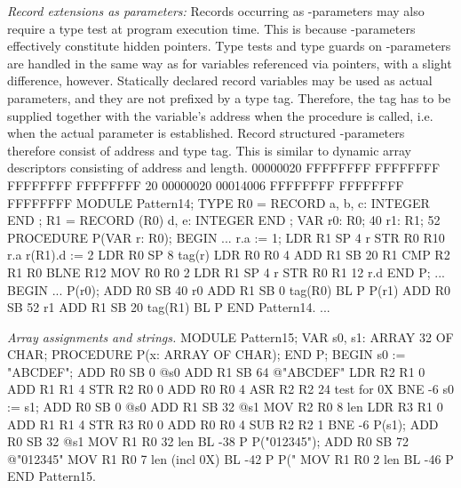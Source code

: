 \noindent {} \emph{Record extensions as  parameters:} Records occurring as -parameters may also require a type test at program execution time. This is because -parameters effectively constitute hidden pointers. Type tests and type guards on -parameters are handled in the same way as for variables referenced via pointers, with a slight difference, however. Statically declared record variables may be used as actual parameters, and they are not prefixed by a type tag. Therefore, the tag has to be supplied together with the variable's address when the procedure is called, i.e. when the actual parameter is established. Record structured -parameters therefore consist of address and type tag. This is similar to dynamic array descriptors consisting of address and length.
 00000020 FFFFFFFF FFFFFFFF FFFFFFFF FFFFFFFF
    20 00000020 00014006 FFFFFFFF FFFFFFFF FFFFFFFF
MODULE Pattern14;
  TYPE
    R0 = RECORD a, b, c: INTEGER END ;
    R1 = RECORD (R0) d, e: INTEGER END ;
  VAR
    r0: R0;                  40
    r1: R1;                  52
  PROCEDURE P(VAR r: R0);
  BEGIN                      ...  
    r.a := 1;                LDR  R1 SP 4    r
                             STR  R0 R10     r.a
    r(R1).d := 2             LDR  R0 SP 8    tag(r)
                             LDR  R0 R0 4
                             ADD  R1 SB 20   R1
                             CMP  R2 R1 R0
                             BLNE R12
                             MOV  R0 R0 2
                             LDR  R1 SP 4    r
                             STR  R0 R1 12   r.d
  END P;                     ...
  BEGIN                      ...
    P(r0);                   ADD R0 SB 40    r0
                             ADD R1 SB 0     tag(R0)
                             BL P
    P(r1)                    ADD R0 SB 52    r1
                             ADD R1 SB 20    tag(R1)
                             BL P
  END Pattern14.             ...
\endtt

\noindent {} \emph{Array assignments and strings.}
\begintt
MODULE Pattern15;
  VAR s0, s1: ARRAY 32 OF CHAR;
  PROCEDURE P(x: ARRAY OF CHAR);
  END P;
BEGIN s0 := "ABCDEF";   ADD R0 SB   0    @s0
                        ADD R1 SB   64   @"ABCDEF"
                        LDR R2 R1   0 
                        ADD R1 R1   4 
                        STR R2 R0   0 
                        ADD R0 R0   4 
                        ASR R2 R2   24   test for 0X
                        BNE -6
  s0 := s1;             ADD R0 SB   0    @s0
                        ADD R1 SB   32   @s1
                        MOV R2 R0   8    len
                        LDR R3 R1   0
                        ADD R1 R1   4
                        STR R3 R0   0 
                        ADD R0 R0   4
                        SUB R2 R2   1
                        BNE -6
  P(s1);                ADD R0 SB   32   @s1
                        MOV R1 R0   32   len
                        BL -38           P
  P("012345");          ADD R0 SB   72   @"012345"
                        MOV R1 R0   7    len (incl 0X)
                        BL -42           P
  P("%
                        MOV R1 R0   2    len
                        BL -46           P
END Pattern15.
\endtt

